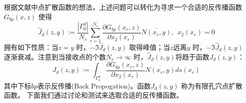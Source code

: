 根据文献\cite{ch_ha}中点扩散函数的想法，上述问题可以转化为寻求一个合适的反传播函数$G_{bp}(x,z)$ 使得
\begin{equation}
\hat J_d(z,y):=\frac{|\Gamma_0^d|}{N_r}\sum\limits_{r=1}^{N_r}\frac{\partial G_{bp}(x_r,z)}{\partial x_2(x_r)}\overline{N(x_r,y)},\ \ x_2(x_r)=0
\end{equation}
拥有如下性质：当$z=y$ 时，$-\Im\hat J_d(z,y)$ 取得峰值；当$z$远离$y$ 时，$-\Im\hat J_d(z,y)$ 逐渐衰减。注意到当接收点的个数$N_r\rightarrow\infty$ 时，$\hat J_d(z,y)$将趋于函数$J_d(z,y)$：
\begin{equation}
  J_d(z,y):=\int_{\Gamma_0^d}\frac{\partial G_{bp}(x_r,z)}{\partial x_2(x_r)}\overline{N(x_r,y)}ds(x_r)
\end{equation}
其中下标$bp$表示反传播(Back Propogation)。函数$J_d(z,y)$ 称为有限孔穴点扩散函数。
下面我们通过讨论和测试来选取合适的反传播函数。
